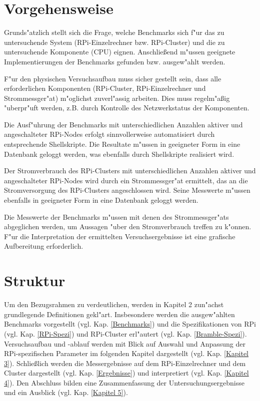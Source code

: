
\section{Vorgehensweise}\label{Vorgehensweise}

Grunds"atzlich stellt sich die Frage, welche Benchmarks sich f"ur das zu untersuchende System (RPi-Einzelrechner bzw. RPi-Cluster) und die zu untersuchende Komponente (CPU) eignen. Anschlie\ss end m"ussen geeignete Implementierungen der Benchmarks gefunden bzw. ausgew"ahlt werden.  

F"ur den physischen Versuchsaufbau muss sicher gestellt sein, dass alle erforderlichen Komponenten (RPi-Cluster, RPi-Einzelrechner und Strommessger"at) m"oglichst zuverl"assig arbeiten. Dies muss regelm"a\ss ig "uberpr"uft werden, z.B. durch Kontrolle des Netzwerkstatus der Komponenten.  

Die Ausf"uhrung der Benchmarks mit unterschiedlichen Anzahlen aktiver und angeschalteter RPi-Nodes erfolgt sinnvollerweise automatisiert durch entsprechende Shellskripte. Die Resultate m"ussen in geeigneter Form in eine Datenbank geloggt werden, was ebenfalls durch Shellskripte realisiert wird. 

Der Stromverbrauch des RPi-Clusters mit unterschiedlichen Anzahlen aktiver und angeschalteter RPi-Nodes wird durch ein Strommessger"at ermittelt, das an die Stromversorgung des RPi-Clusters angeschlossen wird. Seine Messwerte m"ussen ebenfalls in geeigneter Form in eine Datenbank geloggt werden.  

Die Messwerte der Benchmarks m"ussen mit denen des Strommessger"ats abgeglichen werden, um Aussagen "uber den Stromverbrauch treffen zu k"onnen. F"ur die Interpretation der ermittelten Versuchsergebnisse ist eine grafische Aufbereitung erforderlich.

\section{Struktur}\label{Struktur}

Um den Bezugsrahmen zu verdeutlichen, werden in Kapitel 2 zun"achst grundlegende Definitionen gekl"art. Insbesondere werden die ausgew"ahlten Benchmarks vorgestellt (vgl. Kap. \ref{Benchmarks}) und die Spezifikationen von RPi (vgl. Kap. \ref{RPi-Spezi}) und RPi-Cluster erl"autert (vgl. Kap. \ref{Bramble-Spezi}). Versuchsaufbau und -ablauf werden mit Blick auf Auswahl und Anpassung der RPi-spezifischen Parameter im folgenden Kapitel dargestellt (vgl. Kap. \ref{Kapitel 3}). Schlie\ss lich  werden die Messergebnisse auf dem RPi-Einzelrechner und dem Cluster dargestellt (vgl. Kap. \ref{Ergebnisse}) und interpretiert (vgl. Kap. \ref{Kapitel 4}). Den Abschluss bilden eine Zusammenfassung der Untersuchungsergebnisse und ein Ausblick (vgl. Kap. \ref{Kapitel 5}).

\endinput 
